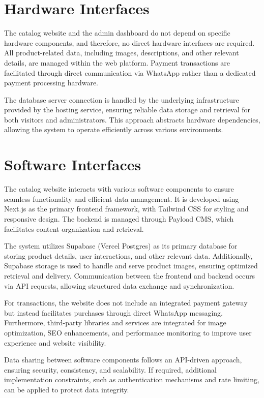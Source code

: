 \documentclass[oneside,a4paper,12pt,explicit]{book}
\begin{document}
\section{Hardware Interfaces}
The catalog website and the admin dashboard do not depend on specific hardware components, and therefore, no direct hardware interfaces are required. All product-related data, including images, descriptions, and other relevant details, are managed within the web platform. Payment transactions are facilitated through direct communication via WhatsApp rather than a dedicated payment processing hardware.

The database server connection is handled by the underlying infrastructure provided by the hosting service, ensuring reliable data storage and retrieval for both visitors and administrators. This approach abstracts hardware dependencies, allowing the system to operate efficiently across various environments.

\section{Software Interfaces}
The catalog website interacts with various software components to ensure seamless functionality and efficient data management. It is developed using Next.js as the primary frontend framework, with Tailwind CSS for styling and responsive design. The backend is managed through Payload CMS, which facilitates content organization and retrieval.

The system utilizes Supabase (Vercel Postgres) as its primary database for storing product details, user interactions, and other relevant data. Additionally, Supabase storage is used to handle and serve product images, ensuring optimized retrieval and delivery. Communication between the frontend and backend occurs via API requests, allowing structured data exchange and synchronization.

For transactions, the website does not include an integrated payment gateway but instead facilitates purchases through direct WhatsApp messaging. Furthermore, third-party libraries and services are integrated for image optimization, SEO enhancements, and performance monitoring to improve user experience and website visibility.

Data sharing between software components follows an API-driven approach, ensuring security, consistency, and scalability. If required, additional implementation constraints, such as authentication mechanisms and rate limiting, can be applied to protect data integrity.
\end{document}
